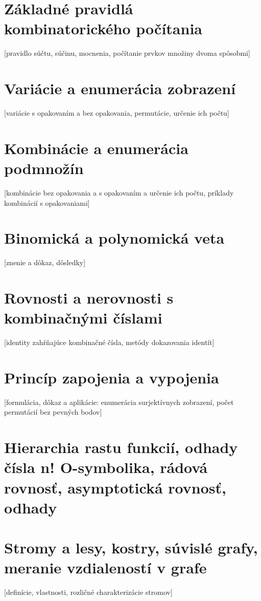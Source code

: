 \section {Základné pravidlá kombinatorického počítania}
  [pravidlo súčtu, súčinu, mocnenia, počítanie prvkov množiny dvoma spôsobmi] 

\section {Variácie a enumerácia zobrazení}
  [variácie s opakovaním a bez opakovania, permutácie, určenie ich počtu] 

\section {Kombinácie a enumerácia podmnožín}
  [kombinácie bez opakovania a s opakovaním a určenie ich počtu, príklady kombinácií s opakovaniami] 

\section {Binomická a polynomická veta}
  [znenie a dôkaz, dôsledky] 

\section {Rovnosti a nerovnosti s kombinačnými číslami}
  [identity zahŕňajúce kombinačné čísla, metódy dokazovania identít]

\section {Princíp zapojenia a vypojenia}
  [formulácia, dôkaz a aplikácie: enumerácia surjektívnych zobrazení, počet permutácií bez pevných bodov]

\section {Hierarchia rastu funkcií, odhady čísla n! O-symbolika, rádová rovnosť, asymptotická rovnosť, odhady}

\section {Stromy a lesy, kostry, súvislé grafy, meranie vzdialeností v grafe} 
  [definície, vlastnosti, rozličné charakterizácie stromov]

